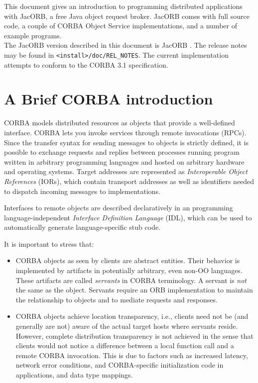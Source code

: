 %
%

This document gives an introduction to programming distributed
applications with JacORB, a free Java object request broker. JacORB
comes with full source code, a couple of CORBA Object Service
implementations, and a number of example programs. \\

The JacORB version described in this document is JacORB \JacORBVersion.
The release notes may be found in {\tt <install>/doc/REL\_NOTES}. The current
implementation attempts to conform to the CORBA 3.1 specification.

\section{A Brief CORBA introduction}

CORBA models distributed resources as objects that provide a
well-defined interface. CORBA lets you invoke services through remote
invocations (RPCs). Since the transfer syntax for sending messages to
objects is strictly defined, it is possible to exchange requests and
replies between processes running program written in arbitrary
programming languages and hosted on arbitrary hardware and operating
systems. Target addresses are represented as {\em Interoperable Object
References} (IORs), which contain transport addresses as well as
identifiers needed to dispatch incoming messages to implementations.

Interfaces to remote objects are described declaratively in an
programming language-independent {\em Interface Definition Language}
(IDL), which can be used to automatically generate language-specific
stub code.

It is important to stress that:
\begin{itemize}
\item CORBA objects as seen by clients are abstract entities. Their
  behavior is implemented by artifacts in potentially arbitrary, even
  non-OO languages. These artifacts are called {\em servants} in CORBA
  terminology. A servant is {\em not} the same as the object. Servants
  require an ORB implementation to maintain the relationship to
  objects and to mediate requests and responses.
\item CORBA objects achieve location transparency, i.e., clients need
  not be (and generally are not) aware of the actual target hosts
  where servants reside. However, complete distribution transparency
  is not achieved in the sense that clients would not notice a
  difference between a local function call and a remote CORBA
  invocation. This is due to factors such as increased latency,
  network error conditions, and CORBA-specific initialization code in
  applications, and data type mappings.
\end{itemize}

